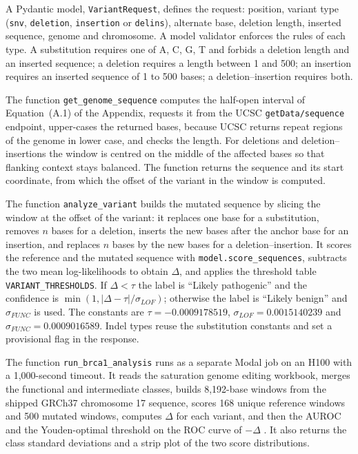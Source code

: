 A Pydantic model, \texttt{VariantRequest}, defines the request: position, variant type (\texttt{snv}, \texttt{deletion}, \texttt{insertion} or \texttt{delins}), alternate base, deletion length, inserted sequence, genome and chromosome. A model validator enforces the rules of each type. A substitution requires one of A, C, G, T and forbids a deletion length and an inserted sequence; a deletion requires a length between 1 and 500; an insertion requires an inserted sequence of 1 to 500 bases; a deletion--insertion requires both.

The function \texttt{get\_genome\_sequence} computes the half-open interval of Equation~(A.1) of the Appendix, requests it from the UCSC \texttt{getData/sequence} endpoint, upper-cases the returned bases, because UCSC returns repeat regions of the genome in lower case, and checks the length. For deletions and deletion--insertions the window is centred on the middle of the affected bases so that flanking context stays balanced. The function returns the sequence and its start coordinate, from which the offset of the variant in the window is computed.

The function \texttt{analyze\_variant} builds the mutated sequence by slicing the window at the offset of the variant: it replaces one base for a substitution, removes $n$ bases for a deletion, inserts the new bases after the anchor base for an insertion, and replaces $n$ bases by the new bases for a deletion--insertion. It scores the reference and the mutated sequence with \texttt{model.score\_sequences}, subtracts the two mean log-likelihoods to obtain $\Delta$, and applies the threshold table \texttt{VARIANT\_THRESHOLDS}. If $\Delta<\tau$ the label is ``Likely pathogenic'' and the confidence is $\min(1,|\Delta-\tau|/\sigma_{LOF})$; otherwise the label is ``Likely benign'' and $\sigma_{FUNC}$ is used. The constants are $\tau=-0.0009178519$, $\sigma_{LOF}=0.0015140239$ and $\sigma_{FUNC}=0.0009016589$. Indel types reuse the substitution constants and set a provisional flag in the response.

The function \texttt{run\_brca1\_analysis} runs as a separate Modal job on an H100 with a 1,000-second timeout. It reads the saturation genome editing workbook, merges the functional and intermediate classes, builds 8,192-base windows from the shipped GRCh37 chromosome 17 sequence, scores 168 unique reference windows and 500 mutated windows, computes $\Delta$ for each variant, and then the AUROC and the Youden-optimal threshold on the ROC curve of $-\Delta$ \cite{hanley1982roc,youden1950index}. It also returns the class standard deviations and a strip plot of the two score distributions.

